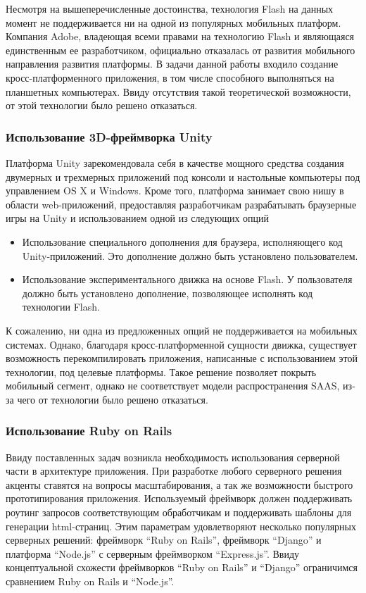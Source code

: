 Несмотря на вышеперечисленные достоинства, технология Flash на данных момент не
поддерживается ни на одной из популярных мобильных платформ. Компания Adobe,
владеющая всеми правами на технологию Flash и являющаяся единственным ее
разработчиком, официально отказалась от развития мобильного направления развития
платформы. В задачи данной работы входило создание кросс-платформенного
приложения, в том числе способного выполняться на планшетных компьютерах. Ввиду
отсутствия такой теоретической возможности, от этой технологии было решено
отказаться.

\subsubsection{Использование 3D-фреймворка Unity}

Платформа Unity зарекомендовала себя в качестве мощного средства создания
двумерных и трехмерных приложений под консоли и настольные компьютеры под
управлением OS X и Windows. Кроме того, платформа занимает свою нишу в области
web-приложений, предоставляя разработчикам разрабатывать браузерные игры на
Unity и использованием одной из следующих опций

\begin{itemize}
    \item Использование специального дополнения для браузера, исполняющего код
    Unity-приложений. Это дополнение должно быть установлено пользователем.
    \item Использование экспериментального движка на основе Flash. У
    пользователя должно быть установлено дополнение, позволяющее исполнять код
    технологии Flash.
\end{itemize}

К сожалению, ни одна из предложенных опций не поддерживается на мобильных
системах. Однако, благодаря кросс-платформенной сущности движка, существует
возможность перекомпилировать приложения, написанные с использованием этой
технологии, под целевые платформы. Такое решение позволяет покрыть мобильный
сегмент, однако не соответствует модели распространения SAAS, из-за чего от
технологии было решено отказаться.

\subsubsection{Использование Ruby on Rails}

Ввиду поставленных задач возникла необходимость использования серверной части в
архитектуре приложения. При разработке любого серверного решения
акценты ставятся на вопросы масштабирования, а так же возможности быстрого
прототипирования приложения. Используемый фреймворк должен
поддерживать роутинг запросов соответствующим обработчикам и поддерживать
шаблоны для генерации html-страниц. Этим параметрам удовлетворяют
несколько популярных серверных решений: фреймворк ``Ruby on Rails'', фреймворк
``Django'' и платформа ``Node.js'' с серверным фреймворком
``Express.js''\cite{expressjs}. Ввиду
концептуальной схожести фреймворков ``Ruby on Rails'' и ``Django'' ограничимся сравнением Ruby on Rails и ``Node.js''.


